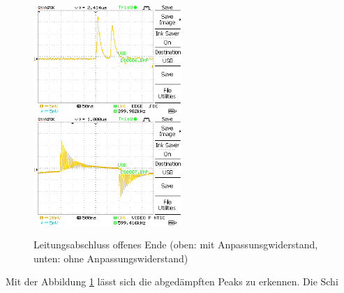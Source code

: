 \documentclass{article}
\begin{document}
				\begin{figure}[H]
					\centering
					\includegraphics[width=0.5\textwidth]{MesswerteVersuch1/DS0006.png}
					\includegraphics[width=0.5\textwidth]{MesswerteVersuch1/DS0007.png}
					\caption{Leitungsabschluss offenes Ende (oben: mit Anpassunsgwiderstand, unten: ohne Anpassungswiderstand)}
					\label{fig:DS0006,7}
				\end{figure}
 
                Mit der Abbildung \ref*{fig:DS0006,7} lässt sich die abgedämpften Peaks
                zu erkennen. Die Schi
\end{document}
